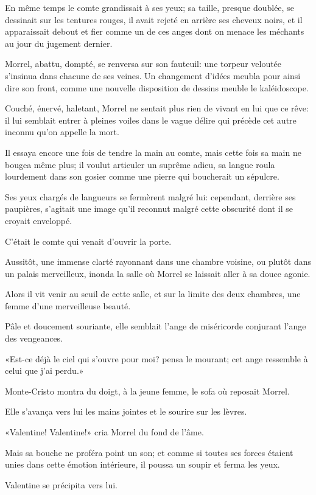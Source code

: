 En même temps le comte grandissait à ses yeux; sa taille, presque doublée, se dessinait sur les tentures rouges, il avait rejeté en arrière ses cheveux noirs, et il apparaissait debout et fier comme un de ces anges dont on menace les méchants au jour du jugement dernier. 

Morrel, abattu, dompté, se renversa sur son fauteuil: une torpeur veloutée s'insinua dans chacune de ses veines. Un changement d'idées meubla pour ainsi dire son front, comme une nouvelle disposition de dessins meuble le kaléidoscope. 

Couché, énervé, haletant, Morrel ne sentait plus rien de vivant en lui que ce rêve: il lui semblait entrer à pleines voiles dans le vague délire qui précède cet autre inconnu qu'on appelle la mort. 

Il essaya encore une fois de tendre la main au comte, mais cette fois sa main ne bougea même plus; il voulut articuler un suprême adieu, sa langue roula lourdement dans son gosier comme une pierre qui boucherait un sépulcre. 

Ses yeux chargés de langueurs se fermèrent malgré lui: cependant, derrière ses paupières, s'agitait une image qu'il reconnut malgré cette obscurité dont il se croyait enveloppé. 

C'était le comte qui venait d'ouvrir la porte. 

Aussitôt, une immense clarté rayonnant dans une chambre voisine, ou plutôt dans un palais merveilleux, inonda la salle où Morrel se laissait aller à sa douce agonie. 

Alors il vit venir au seuil de cette salle, et sur la limite des deux chambres, une femme d'une merveilleuse beauté. 

Pâle et doucement souriante, elle semblait l'ange de miséricorde conjurant l'ange des vengeances. 

«Est-ce déjà le ciel qui s'ouvre pour moi? pensa le mourant; cet ange ressemble à celui que j'ai perdu.» 

Monte-Cristo montra du doigt, à la jeune femme, le sofa où reposait Morrel. 

Elle s'avança vers lui les mains jointes et le sourire sur les lèvres. 

«Valentine! Valentine!» cria Morrel du fond de l'âme. 

Mais sa bouche ne proféra point un son; et comme si toutes ses forces étaient unies dans cette émotion intérieure, il poussa un soupir et ferma les yeux. 

Valentine se précipita vers lui. 

